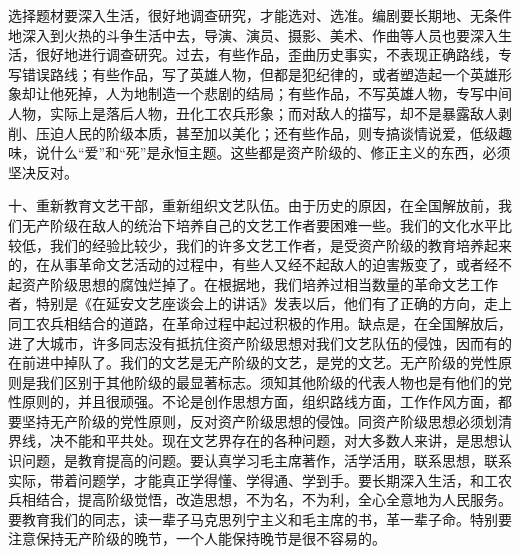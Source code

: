 选择题材要深入生活，很好地调查研究，才能选对、选准。编剧要长期地、无条件地深入到火热的斗争生活中去，导演、演员、摄影、美术、作曲等人员也要深入生活，很好地进行调查研究。过去，有些作品，歪曲历史事实，不表现正确路线，专写错误路线；有些作品，写了英雄人物，但都是犯纪律的，或者塑造起一个英雄形象却让他死掉，人为地制造一个悲剧的结局；有些作品，不写英雄人物，专写中间人物，实际上是落后人物，丑化工农兵形象；而对敌人的描写，却不是暴露敌人剥削、压迫人民的阶级本质，甚至加以美化；还有些作品，则专搞谈情说爱，低级趣味，说什么“爱”和“死”是永恒主题。这些都是资产阶级的、修正主义的东西，必须坚决反对。

十、重新教育文艺干部，重新组织文艺队伍。由于历史的原因，在全国解放前，我们无产阶级在敌人的统治下培养自己的文艺工作者要困难一些。我们的文化水平比较低，我们的经验比较少，我们的许多文艺工作者，是受资产阶级的教育培养起来的，在从事革命文艺活动的过程中，有些人又经不起敌人的迫害叛变了，或者经不起资产阶级思想的腐蚀烂掉了。在根据地，我们培养过相当数量的革命文艺工作者，特别是《在延安文艺座谈会上的讲话》发表以后，他们有了正确的方向，走上同工农兵相结合的道路，在革命过程中起过积极的作用。缺点是，在全国解放后，进了大城市，许多同志没有抵抗住资产阶级思想对我们文艺队伍的侵蚀，因而有的在前进中掉队了。我们的文艺是无产阶级的文艺，是党的文艺。无产阶级的党性原则是我们区别于其他阶级的最显著标志。须知其他阶级的代表人物也是有他们的党性原则的，并且很顽强。不论是创作思想方面，组织路线方面，工作作风方面，都要坚持无产阶级的党性原则，反对资产阶级思想的侵蚀。同资产阶级思想必须划清界线，决不能和平共处。现在文艺界存在的各种问题，对大多数人来讲，是思想认识问题，是教育提高的问题。要认真学习毛主席著作，活学活用，联系思想，联系实际，带着问题学，才能真正学得懂、学得通、学到手。要长期深入生活，和工农兵相结合，提高阶级觉悟，改造思想，不为名，不为利，全心全意地为人民服务。要教育我们的同志，读一辈子马克思列宁主义和毛主席的书，革一辈子命。特别要注意保持无产阶级的晚节，一个人能保持晚节是很不容易的。

